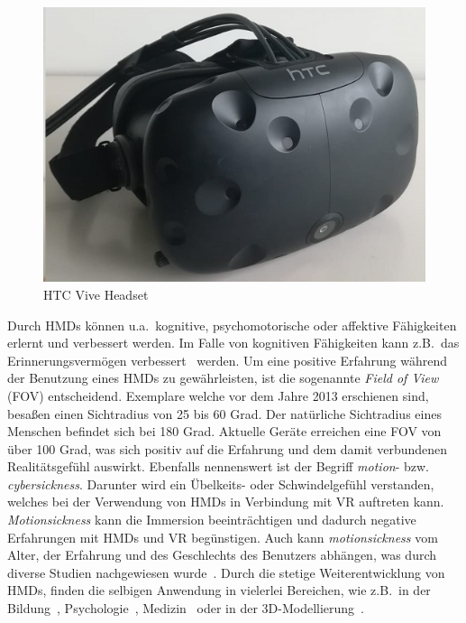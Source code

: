 \begin{figure}[h]
\captionsetup{width=.7\linewidth}
\includegraphics[scale=0.75]{Bilder/Hauptteil/viveheadset}
\centering
\caption{HTC Vive Headset}
\label{fig:hmds}
\end{figure}

\noindent Durch HMDs können u.a.~kognitive, psychomotorische oder affektive Fähigkeiten erlernt und verbessert werden. Im Falle von kognitiven Fähigkeiten kann z.B.~das Erinnerungs\-vermögen verbessert~\cite{hmdsineducation} werden. Um eine positive Erfahrung während der Benutzung eines HMDs zu gewährleisten, ist die sogenannte \textit{Field of View} (FOV) entscheidend. Exemplare welche vor dem Jahre 2013 erschienen sind, besaßen einen Sichtradius von 25 bis 60 Grad. Der natürliche Sichtradius eines Menschen befindet sich bei 180 Grad. Aktuelle Geräte erreichen eine FOV von über 100 Grad, was sich positiv auf die Erfahrung und dem damit verbundenen Realitätsgefühl auswirkt. Ebenfalls nennenswert ist der Begriff \textit{motion}- bzw. \textit{cybersickness}. Darunter wird ein Übelkeits- oder Schwindelgefühl verstanden, welches bei der Verwendung von HMDs in Verbindung mit VR auftreten kann. \textit{Motionsickness} kann die Immersion beeinträchtigen und dadurch negative Erfahrungen mit HMDs und VR begünstigen. Auch kann \textit{motionsickness} vom Alter, der Erfahrung und des Geschlechts des Benutzers abhängen, was durch diverse Studien nachgewiesen wurde~\cite{hmdsineducation}. Durch die stetige Weiterentwicklung von HMDs, finden die selbigen Anwendung in vielerlei Bereichen, wie z.B.~in der Bildung~\cite{hmdsineducation}, Psychologie~\cite{hmdsinpsychology}, Medizin~\cite{hmdsinmedicine} oder in der 3D-Modellierung~\cite{hmdsinmodeling}.

